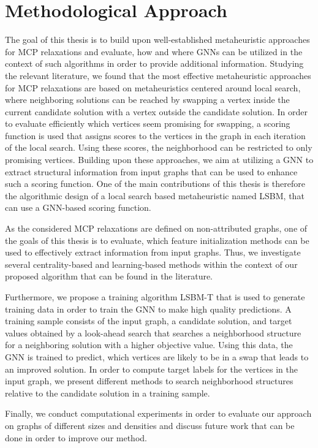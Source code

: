 \documentclass[draft,final]{vutinfth} %
\begin{document}
\section{Methodological Approach}\label{sec:methodology}
The goal of this thesis is to build upon well-established metaheuristic approaches for MCP relaxations and evaluate, how and where GNNs can be utilized in the context of such algorithms in order to provide additional information. 
Studying the relevant literature, we found that the most effective metaheuristic approaches for MCP relaxations are based on metaheuristics centered around local search, where neighboring solutions can be reached by swapping a vertex inside the current candidate solution with a vertex outside the candidate solution. In order to evaluate efficiently which vertices seem promising for swapping, a scoring function is used that assigns scores to the vertices in the graph in each iteration of the local search. Using these scores, the neighborhood can be restricted to only promising vertices. 
Building upon these approaches, we aim at utilizing a GNN to extract structural information from input graphs that can be used to enhance such a scoring function. 
One of the main contributions of this thesis is therefore the algorithmic design of a local search based metaheuristic named LSBM, that can use a GNN-based scoring function. 

As the considered MCP relaxations are defined on non-attributed graphs, one of the goals of this thesis is to evaluate, which feature initialization methods can be used to effectively extract information from input graphs. Thus, we investigate several centrality-based and learning-based methods within the context of our proposed algorithm that can be found in the literature. 

Furthermore, we propose a training algorithm LSBM-T that is used to generate training data in order to train the GNN to make high quality predictions. A training sample consists of the input graph, a candidate solution, and target values obtained by a look-ahead search that searches a neighborhood structure for a neighboring solution with a higher objective value. Using this data, the GNN is trained to predict, which vertices are likely to be in a swap that leads to an improved solution. In order to compute target labels for the vertices in the input graph, we present different methods to search neighborhood structures relative to the candidate solution in a training sample. 

Finally, we conduct computational experiments in order to evaluate our approach on graphs of different sizes and densities and discuss future work that can be done in order to improve our method. 
\end{document}
